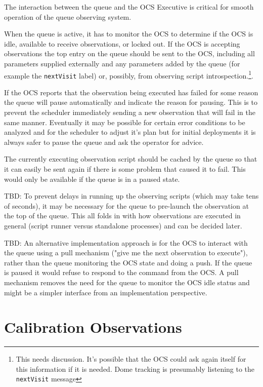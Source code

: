\documentclass[TS,toc,lsstdraft]{lsstdoc}
\begin{document}
The interaction between the queue and the OCS Executive is critical for smooth operation of the queue observing system.

When the queue is active, it has to monitor the OCS to determine if the OCS is idle, available to receive observations, or locked out.
If the OCS is accepting observations the top entry on the queue should be sent to the OCS, including all parameters supplied externally and any parameters added by the queue (for example the \texttt{nextVisit} label) or, possibly, from observing script introspection.\footnote{This needs discussion. It's possible that the OCS could ask again itself for this information if it is needed. Dome tracking is presumably listening to the \texttt{nextVisit} message}.

If the OCS reports that the observation being executed has failed for some reason the queue will pause automatically and indicate the reason for pausing.
This is to prevent the scheduler immediately sending a new observation that will fail in the same manner.
Eventually it may be possible for certain error conditions to be analyzed and for the scheduler to adjust it's plan but for initial deployments it is always safer to pause the queue and ask the operator for advice.

The currently executing observation script should be cached by the queue so that it can easily be sent again if there is some problem that caused it to fail.
This would only be available if the queue is in a paused state.

TBD: To prevent delays in running up the observing scripts (which may take tens of seconds), it may be necessary for the queue to pre-launch the observation at the top of the queue.
This all folds in with how observations are executed in general (script runner versus standalone processes) and can be decided later.

TBD: An alternative implementation approach is for the  OCS to interact with the queue using a pull mechanism ("give me the next observation to execute"), rather than the queue monitoring the OCS state and doing a push.
If the queue is paused it would refuse to respond to the command from the OCS.
A pull mechanism removes the need for the queue to monitor the OCS idle status and might be a simpler interface from an implementation perspective.

\section{Calibration Observations}
\end{document}
